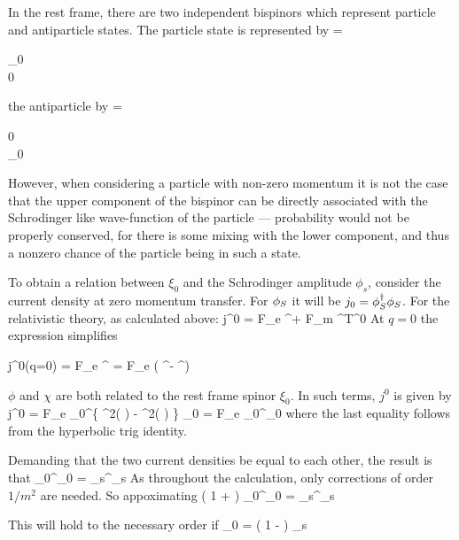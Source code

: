 In the rest frame, there are two independent bispinors which represent particle and antiparticle states.  The particle state is represented by
\beq
	\Psig = \begin{pmatrix} \xi_0 \\ 0 \end{pmatrix}
\eeq
the antiparticle by
\beq
	\Psig = \begin{pmatrix} 0 \\ \xi_0 \end{pmatrix}
\eeq

However, when considering a particle with non-zero momentum it is not the case that the upper component of the bispinor can be directly associated with the Schrodinger like wave-function of the particle --- probability would not be properly conserved, for there is some mixing with the lower component, and thus a nonzero chance of the particle being in such a state.

To obtain a relation between $\xi_0$ and the Schrodinger amplitude $\phi_s$,  consider the current density at zero momentum transfer.  For $\phi_S$ it will be $j_0 =  \phi_S^\dagger \phi_S$.  For the relativistic theory, as calculated above:
\beq
	j^0 = F_e  \Psigbar^\dagger \Psig + F_m 	 \Psigbar^\dagger T^{0\nu} \Psig	
\eeq
At $q=0$ the expression simplifies

\beq
	j^0(q=0) = F_e  \Psigbar^\dagger \Psig
	= F_e  ( \phi^\dagger \phi - \chi^\dagger \chi )
\eeq

$\phi$ and $\chi$ are both related to the rest frame spinor $\xi_0$.  In such terms, $j^0$ is given by
\beq
	j^0 = F_e  \xi_0^\dagger \left \{ 
		\cosh^2( )
		- \sinh^2( )
	\right \} \xi_0  
		=	F_e  \xi_0^\dagger \xi_0
\eeq
where the last equality follows from the hyperbolic trig identity.


Demanding that the two current densities be equal to each other, the result is that
\beq
	 \xi_0^\dagger \xi_0 = \phi_s^\dagger \phi_s
\eeq
As throughout the calculation, only corrections of order $1/m^2$ are needed.  So appoximating
\beq
	\left( 1 +  \right) \xi_0^\dagger \xi_0 = \phi_s^\dagger \phi_s
\eeq

This will hold to the necessary order if
\beq
	\xi_0 = \left( 1 -  \right) \phi_s
\eeq



